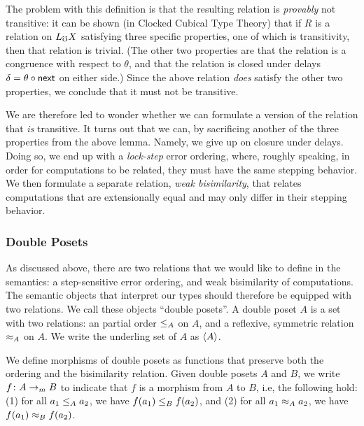 The problem with this definition is that the resulting relation is \emph{provably} not
transitive: it can be shown (in Clocked Cubical Type Theory) that if $R$ is a
relation on $L_\mho X$ satisfying three specific properties, one of which is
transitivity, then that relation is trivial.
(The other two properties are that the relation is a congruence with respect to $\theta$,
and that the relation is closed under delays $\delta = \theta \circ \mathsf{next}$ on either side.)
Since the above relation \emph{does} satisfy the other two properties, we conclude
that it must not be transitive.


We are therefore led to wonder whether we can formulate a version of the relation
that \emph{is} transitive.
It turns out that we can, by sacrificing another of the three properties from
the above lemma. Namely, we give up on closure under delays. Doing so, we end up
with a \emph{lock-step} error ordering, where, roughly speaking, in order for
computations to be related, they must have the same stepping behavior.
%
We then formulate a separate relation, \emph{weak bisimilarity}, that relates computations
that are extensionally equal and may only differ in their stepping behavior.



\subsubsection{Double Posets}\label{sec:predomains}

As discussed above, there are two relations that we would like to define
in the semantics: a step-sensitive error ordering, and weak bisimilarity of computations.
%
The semantic objects that interpret our types should therefore be equipped with
two relations. We call these objects ``double posets''.
A double poset $A$ is a set with two relations: an partial order $\le_A$ on $A$, and
a reflexive, symmetric relation $\approx_A$ on $A$.
We write the underling set of $A$ as $\langle {A} \rangle$.

We define morphisms of double posets as functions that preserve both
the ordering and the bisimilarity relation. Given double posets
$A$ and $B$, we write $f \colon A \to_m B$ to indicate that $f$ is a morphism
from $A$ to $B$, i.e, the following hold:
(1) for all $a_1 \le_A a_2$, we have $f(a_1) \le_{B} f(a_2)$, and
(2) for all $a_1 \approx_A a_2$, we have $f(a_1) \approx_{B} f(a_2)$.


